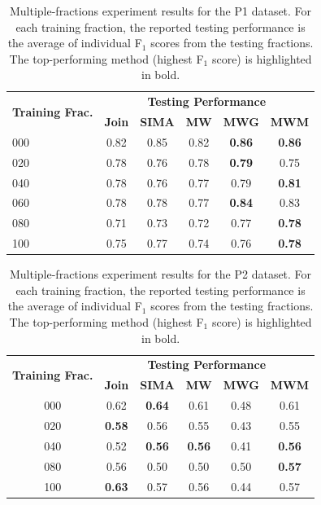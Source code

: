 \begin{table}[!htbp]
\noindent \begin{centering}
\begin{tabular}{|l|c|c|c|c|c|}
\hline 
\multirow{2}{*}{\textbf{Training Frac.}} & \multicolumn{5}{c|}{\textbf{Testing Performance}}\tabularnewline
\cline{2-6} 
 & \textbf{Join} & \textbf{SIMA} & \textbf{MW} & \textbf{MWG} & \textbf{MWM}\tabularnewline
\hline 
\hline 
\multirow{1}{*}{{000}} & {0.82} & {0.85} & {0.82} & \textbf{0.86} & \textbf{0.86}\tabularnewline
\hline 
\multirow{1}{*}{{020}} & {0.78} & {0.76} & {0.78} & \textbf{0.79} & {0.75}\tabularnewline
\hline 
\multirow{1}{*}{{040}} & {0.78} & {0.76} & {0.77} & {0.79} & \textbf{0.81}\tabularnewline
\hline 
\multirow{1}{*}{{060}} & {0.78} & {0.78} & {0.77} & \textbf{0.84} & {0.83}\tabularnewline
\hline 
\multirow{1}{*}{{080}} & {0.71} & {0.73} & {0.72} & {0.77} & \textbf{0.78}\tabularnewline
\hline 
\multirow{1}{*}{{100}} & {0.75} & {0.77} & {0.74} & {0.76} & \textbf{0.78}\tabularnewline
\hline 
\end{tabular}
\par\end{centering}
\caption{\label{tab:within-P1}Multiple-fractions experiment results for the
P1 dataset. For each training fraction, the reported testing performance is the average of individual F$_1$ scores from the testing fractions. The top-performing method (highest F$_1$ score) is highlighted in bold.}
\end{table}

\begin{table}[!htbp]
\noindent \begin{centering}
\begin{tabular}{|c|c|c|c|c|c|}
\hline 
\multirow{2}{*}{\textbf{Training Frac.}} & \multicolumn{5}{c|}{\textbf{Testing Performance}}\tabularnewline
\cline{2-6} 
 & \textbf{Join} & \textbf{SIMA} & \textbf{MW} & \textbf{MWG} & \textbf{MWM}\tabularnewline
\hline 
\hline 
\multirow{1}{*}{{000}} & {0.62} & \textbf{0.64} & {0.61} & {0.48} & {0.61}\tabularnewline
\hline 
\multirow{1}{*}{{020}} & \textbf{0.58} & {0.56} & {0.55} & {0.43} & {0.55}\tabularnewline
\hline 
\multirow{1}{*}{{040}} & {0.52} & \textbf{0.56} & \textbf{0.56} & {0.41} & \textbf{0.56}\tabularnewline
\hline 
\multirow{1}{*}{{080}} & {0.56} & {0.50} & {0.50} & {0.50} & \textbf{0.57}\tabularnewline
\hline 
\multirow{1}{*}{{100}} & \textbf{0.63} & {0.57} & {0.56} & {0.44} & {0.57}\tabularnewline
\hline 
\end{tabular}
\par\end{centering}
\caption{\label{tab:within-P2}Multiple-fractions experiment results for the
P2 dataset. For each training fraction, the reported testing performance is the average of individual F$_1$ scores from the testing fractions. The top-performing method (highest F$_1$ score) is highlighted in bold.}
\end{table}

